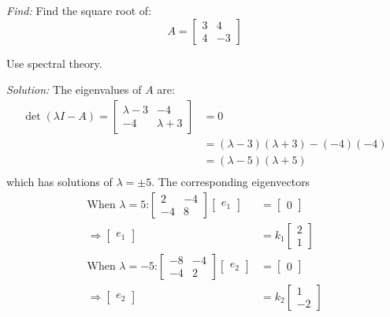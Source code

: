 \documentclass[11pt]{homework}
\begin{document}
\newpage
\question
\emph{Find:}
\newline
Find the square root of:
\begin{equation*}
A = 
  \begin{bmatrix}
  3 & 4 \\
  4 & -3 
  \end{bmatrix}
\end{equation*}

Use spectral theory. 

\emph{Solution:}
\newline
The eigenvalues of $A$ are:
\begin{align*}
\det(\lambda I -A) =
  \begin{bmatrix}
  \lambda - 3 & -4 \\
  -4 & \lambda+3 
  \end{bmatrix}
  &= 0 \\
  &= (\lambda-3)(\lambda+3) - (-4)(-4) \\
  &= (\lambda-5)(\lambda+5) \\
\end{align*}
which has solutions of $\lambda = \pm 5$.
The corresponding eigenvectors
\begin{align*}
\text{When $\lambda=5$:}
  \begin{bmatrix}
  2 & -4 \\
  -4 & 8 
  \end{bmatrix}
  \begin{bmatrix}
    e_1
  \end{bmatrix}
  &= 
  \begin{bmatrix}
    0
  \end{bmatrix} \\
  \Rightarrow
  \begin{bmatrix}
    e_1
  \end{bmatrix}
  &= 
  k_1
  \begin{bmatrix}
    2 \\
    1
  \end{bmatrix} \\
\text{When $\lambda = -5$:}
  \begin{bmatrix}
  -8 & -4 \\
  -4 & 2
  \end{bmatrix}
  \begin{bmatrix}
    e_2
  \end{bmatrix}
  &= 
  \begin{bmatrix}
    0
  \end{bmatrix} \\
  \Rightarrow
  \begin{bmatrix}
    e_2
  \end{bmatrix}
  &= 
  k_2
  \begin{bmatrix}
  1 \\
  -2
  \end{bmatrix} 
\end{align*}
\end{document}
